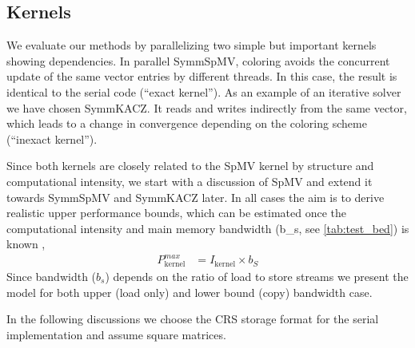 \subsection{Kernels} \label{subsec:test_kernels}
We evaluate our methods by parallelizing two simple but important kernels showing \DTWO dependencies. In parallel \acrfull{SymmSpMV}, \DTWO coloring avoids the concurrent update of the same vector entries by different threads. In this case, the result is identical to the serial code (``exact kernel''). As an example of an iterative solver we have chosen \acrfull{SymmKACZ}. It reads and writes indirectly from the same vector, which leads to a change in convergence depending on the coloring scheme (``inexact kernel'').

Since both kernels are closely related to the \acrshort{SpMV} kernel by structure and computational intensity, we start with a discussion of \acrshort{SpMV} and extend it towards \acrshort{SymmSpMV} and \acrshort{SymmKACZ} later. In all cases the aim is to derive realistic upper performance bounds, which can be estimated once the computational intensity and main memory bandwidth (\acrshort{b_s}, see \cref{tab:test_bed}) is known \cite{Williams_roofline}, \ie
  \begin{align}
   	\label{eq:upper_performance}
   	P^{max}_\mathrm{kernel}  &= I_\mathrm{kernel}  \times b_S
  \end{align}
Since bandwidth ($b_s$) depends on the ratio of load to store streams we present the model for both upper (load only) and lower bound (copy) bandwidth case.  
  
   In the following discussions we choose the \acrshort{CRS} storage format for the serial  implementation and assume square matrices.

